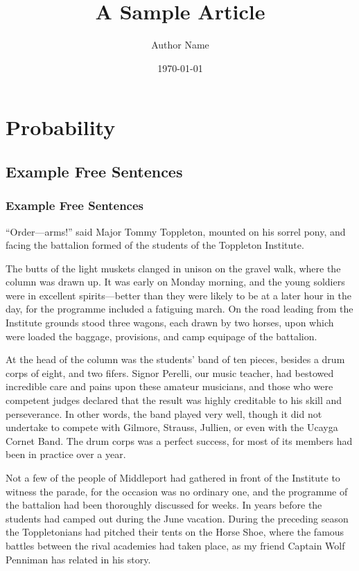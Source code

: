 \documentclass[11pt,a4paper]{article}
\title{A Sample Article}
\author{Author Name}
\date{\today}
\begin{document}
\maketitle
\tableofcontents

\section{Probability}

\subsection{Example Free Sentences}

\subsubsection{Example Free Sentences}

“Order—arms!” said Major Tommy Toppleton, mounted on his sorrel pony, and facing the battalion formed of the students of the Toppleton Institute.

The butts of the light muskets clanged in unison on the gravel walk, where the column was drawn up. It was early on Monday morning, and the young soldiers were in excellent spirits—better than they were likely to be at a later hour in the day, for the programme included a fatiguing march. On the road leading from the Institute grounds stood three wagons, each drawn by two horses, upon which were loaded the baggage, provisions, and camp equipage of the battalion.

At the head of the column was the students’ band of ten pieces, besides a drum corps of eight, and two fifers. Signor Perelli, our music teacher, had bestowed incredible care and pains upon these amateur musicians, and those who were competent judges declared that the result was highly creditable to his skill and perseverance. In other words, the band played very well, though it did not undertake to compete with Gilmore, Strauss, Jullien, or even with the Ucayga Cornet Band. The drum corps was a perfect success, for most of its members had been in practice over a year.

Not a few of the people of Middleport had gathered in front of the Institute to witness the parade, for the occasion was no ordinary one, and the programme of the battalion had been thoroughly discussed for weeks. In years before the students had camped out during the June vacation. During the preceding season the Toppletonians had pitched their tents on the Horse Shoe, where the famous battles between the rival academies had taken place, as my friend Captain Wolf Penniman has related in his story.
\end{document}
